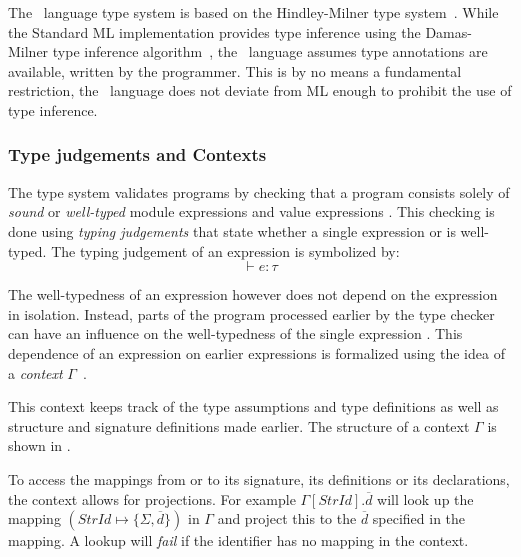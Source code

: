The \MiniML\ language type system is based on the Hindley-Milner type system~\cite{Hindley1969,Milner78atheory}.
While the Standard ML implementation provides type inference using the Damas-Milner type inference algorithm~\cite{Damas:1982:PTF:582153.582176}, the \MiniML\ language assumes type annotations are available, written by the programmer.
This is by no means a fundamental restriction, the \MiniML\ language does not deviate from ML enough to prohibit the use of type inference.

\subsubsection{Type judgements and Contexts}
The type system validates programs by checking that a program  consists solely of \emph{sound} or \emph{well-typed} module expressions  and value expressions .
This checking is done using \emph{typing judgements} that state whether a single expression  or  is well-typed.
The typing judgement of an expression  is symbolized by: 
\[\vdash e:\tau\]

The well-typedness of an expression  however does not depend on the expression  in isolation.
Instead, parts of the program processed earlier by the type checker can have an influence on the well-typedness of the single expression .
This dependence of an expression  on earlier expressions is formalized using the idea of a \emph{context} $\Gamma$~\cite{Pierce}. 

This context keeps track of the type assumptions and type definitions as well as structure and signature definitions made earlier.
The structure of a context $\Gamma$ is shown in .

To access the mappings from  or  to its signature, its definitions or its declarations, the context allows for projections. For example $\Gamma[\mathit{StrId}].\overline{d}$ will look up the mapping $(\mathit{StrId} \mapsto \lbrace \Sigma,\overline{d}\rbrace)$ in $\Gamma$ and project this to the $\overline{d}$ specified in the mapping. A lookup will \emph{fail} if the identifier has no mapping in the context.

